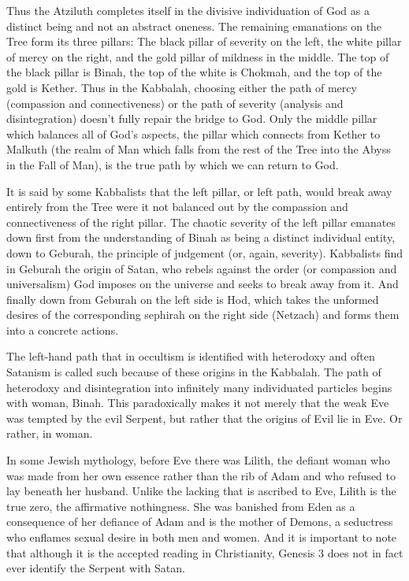\documentclass[12pt, a5paper, twoside, openright]{memoir}
\begin{document}
Thus the Atziluth completes itself in the divisive individuation of God as a distinct being and not an abstract oneness. The remaining emanations on the Tree form its three pillars: The black pillar of severity on the left, the white pillar of mercy on the right, and the gold pillar of mildness in the middle. The top of the black pillar is Binah, the top of the white is Chokmah, and the top of the gold is Kether. Thus in the Kabbalah, choosing either the path of mercy (compassion and connectiveness) or the path of severity (analysis and disintegration) doesn't fully repair the bridge to God. Only the middle pillar which balances all of God's aspects, the pillar which connects from Kether to Malkuth (the realm of Man which falls from the rest of the Tree into the Abyss in the Fall of Man), is the true path by which we can return to God.

It is said by some Kabbalists that the left pillar, or left path, would break away entirely from the Tree were it not balanced out by the compassion and connectiveness of the right pillar. The chaotic severity of the left pillar emanates down first from the understanding of Binah as being a distinct individual entity, down to Geburah, the principle of judgement (or, again, severity). Kabbalists find in Geburah the origin of Satan, who rebels against the order (or compassion and universalism) God imposes on the universe and seeks to break away from it. And finally down from Geburah on the left side is Hod, which takes the unformed desires of the corresponding sephirah on the right side (Netzach) and forms them into a concrete actions.

The left-hand path that in occultism is identified with heterodoxy and often Satanism is called such because of these origins in the Kabbalah. The path of heterodoxy and disintegration into infinitely many individuated particles begins with woman, Binah. This paradoxically makes it not merely that the weak Eve was tempted by the evil Serpent, but rather that the origins of Evil lie in Eve. Or rather, in woman.

In some Jewish mythology, before Eve there was Lilith, the defiant woman who was made from her own essence rather than the rib of Adam and who refused to lay beneath her husband. Unlike the lacking that is ascribed to Eve, Lilith is the true zero, the affirmative nothingness. She was banished from Eden as a consequence of her defiance of Adam and is the mother of Demons, a seductress who enflames sexual desire in both men and women. And it is important to note that although it is the accepted reading in Christianity, Genesis 3 does not in fact ever identify the Serpent with Satan.
\end{document}
